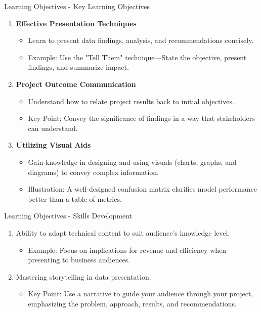 \documentclass[aspectratio=169]{beamer}
\begin{document}
\begin{frame}[fragile]{Learning Objectives - Key Learning Objectives}
    \begin{enumerate}
        \item \textbf{Effective Presentation Techniques}
            \begin{itemize}
                \item Learn to present data findings, analysis, and recommendations concisely.
                \item Example: Use the "Tell Them" technique—State the objective, present findings, and summarize impact.
            \end{itemize}
        
        \item \textbf{Project Outcome Communication}
            \begin{itemize}
                \item Understand how to relate project results back to initial objectives.
                \item Key Point: Convey the significance of findings in a way that stakeholders can understand.
            \end{itemize}

        \item \textbf{Utilizing Visual Aids}
            \begin{itemize}
                \item Gain knowledge in designing and using visuals (charts, graphs, and diagrams) to convey complex information.
                \item Illustration: A well-designed confusion matrix clarifies model performance better than a table of metrics.
            \end{itemize}
    \end{enumerate}
\end{frame}

\begin{frame}[fragile]{Learning Objectives - Skills Development}
    \begin{enumerate}
        \item Ability to adapt technical content to suit audience's knowledge level.
            \begin{itemize}
                \item Example: Focus on implications for revenue and efficiency when presenting to business audiences.
            \end{itemize}
        
        \item Mastering storytelling in data presentation.
            \begin{itemize}
                \item Key Point: Use a narrative to guide your audience through your project, emphasizing the problem, approach, results, and recommendations.
            \end{itemize}
    \end{enumerate}
\end{frame}
\end{document}
